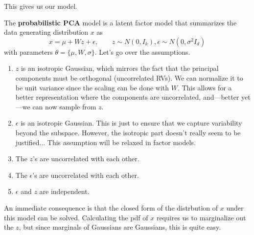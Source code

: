   This gives us our model. 

  \begin{definition}
    \label{def:probabilistic-pca}
 
    The \textbf{probabilistic PCA} model is a latent factor model that summarizes the data generating distribution $x$ as  
    \begin{equation}
      x = \mu + W z + \epsilon, \qquad z \sim N(0, I_k), \epsilon \sim N(0, \sigma^2 I_d) 
    \end{equation} 
    with parameters $\theta = \{\mu, W, \sigma\}$. Let's go over the assumptions. 
    \begin{enumerate}
      \item $z$ is an isotropic Gaussian, which mirrors the fact that the principal components must be orthogonal (uncorrelated RVs). We can normalize it to be unit variance since the scaling can be done with $W$. This allows for a better representation where the components are uncorrelated, and---better yet---we can now sample from $z$. 
      \item $\epsilon$ is an isotropic Gaussian. This is just to ensure that we capture variability beyond the subspace. However, the isotropic part doesn't really seem to be justified... This assumption will be relaxed in factor models.  
      \item The $z$'s are uncorrelated with each other.  
      \item The $\epsilon$'s are uncorrelated with each other. 
      \item $\epsilon$ and $z$ are independent. 
    \end{enumerate}
  \end{definition} 

  An immediate consequence is that the closed form of the distrbution of $x$ under this model can be solved. Calculating the pdf of $x$ requires us to marginalize out the $z$, but since marginals of Gaussians are Gaussians, this is quite easy. 

